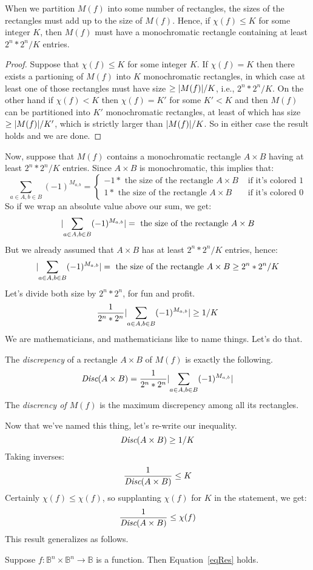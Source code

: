 \documentclass[12pt]{article}
\begin{document}
\maketitle

When we partition $M(f)$ into some number of rectangles,
	the sizes of the rectangles must add up to the size of $M(f)$.
Hence, if $\chi(f) \leq K$ for some integer $K$,
	then $M(f)$ must have a monochromatic rectangle containing at least $2^n * 2^n / K$ entries.
\begin{proof}
Suppose that $\chi(f) \leq K$ for some integer $K$.
If $\chi(f) = K$ then there exists a partioning of $M(f)$ into $K$ monochromatic rectangles, in which case at least one of those rectangles must have size $\geq \lvert M(f)\rvert / K$, i.e., $2^n * 2^n / K$.  On the other hand if $\chi(f) < K$ then $\chi(f) = K'$ for some $K' < K$ and then $M(f)$ can be partitioned into $K'$ monochromatic rectangles, at least of which has size $\geq \lvert M(f)\rvert / K'$, which is strictly larger than $\lvert M(f)\rvert / K$.  So in either case the result holds and we are done.
\end{proof}
Now, suppose that $M(f)$ contains a monochromatic rectangle $A \times B$ having at least $2^n * 2^n / K$ entries.
Since $A \times B$ is monochromatic, this implies that:
\[\sum_{a \in A, b \in B} (-1)^{M_{a,b}} = \begin{cases}
-1 * \text{ the size of the rectangle } A \times B & \text{ if it's colored } 1 \\
 1 * \text{ the size of the rectangle } A \times B & \text{ if it's colored } 0\end{cases}\]
So if we wrap an absolute value above our sum, we get:
\[\lvert\sum_{a \in A, b \in B} (-1)^{M_{a,b}}\rvert = \text{ the size of the rectangle } A \times B\]
But we already assumed that $A \times B$ has at least $2^n * 2^n / K$ entries, hence:
\[\lvert\sum_{a \in A, b \in B} (-1)^{M_{a,b}}\rvert = \text{ the size of the rectangle } A \times B \geq 2^n * 2^n / K\]
Let's divide both size by $2^n * 2^n$, for fun and profit.
\[\frac{1}{2^n * 2^n}\lvert\sum_{a \in A, b \in B} (-1)^{M_{a,b}}\rvert \geq 1 / K\]
We are mathematicians, and mathematicians like to name things.
Let's do that.
\begin{definition}[Discrepency]
The \emph{discrepency} of a rectangle $A \times B$ of $M(f)$ is exactly the following.
\[\emph{Disc}(A \times B) = \frac{1}{2^n * 2^n}\lvert\sum_{a \in A, b \in B} (-1)^{M_{a,b}}\rvert\]
The \emph{discrency of $M(f)$} is the maximum discrepency among all its rectangles.
\end{definition}
Now that we've named this thing, let's re-write our inequality.
\[\emph{Disc}(A \times B) \geq 1 / K\]
Taking inverses:
\[\frac{1}{\emph{Disc}(A \times B)} \leq K\]
Certainly $\chi(f) \leq \chi(f)$, so supplanting $\chi(f)$ for $K$ in the statement, we get:
\begin{equation}
\frac{1}{\emph{Disc}(A \times B)} \leq \chi(f)
\label{eqRes}
\end{equation}
This result generalizes as follows.
\begin{lemma}
Suppose $f : \mathbb{B}^n \times \mathbb{B}^n \to \mathbb{B}$ is a function.
Then Equation~\ref{eqRes} holds.
\end{lemma}
\end{document}
